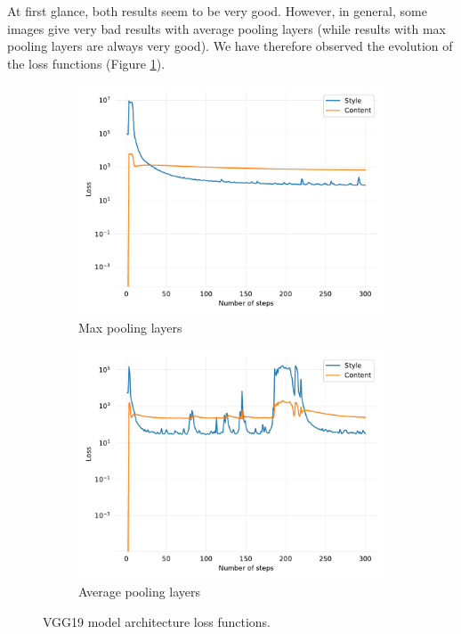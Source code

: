 \documentclass[twocolumn,superscriptaddress,aps,floatfix,nofootinbib]{revtex4-1}
\begin{document}
    At first glance, both results seem to be very good. However, in general, some images give very bad results with average pooling layers (while results with max pooling layers are always very good). We have therefore observed the evolution of the loss functions (Figure \ref{fig:model.architecture.loss}).
    
    \begin{figure}[ht]
        \centering
        \begin{subfigure}[b]{0.22\textwidth}
            \centering
            \includegraphics[width=\textwidth]{resources/pdf/architecture/sun-trees-paris-maxpool.pdf}
            \caption{Max pooling layers}
        \end{subfigure}
        \hfill
        \begin{subfigure}[b]{0.22\textwidth}
            \centering
            \includegraphics[width=\textwidth]{resources/pdf/architecture/sun-trees-paris-avgpool.pdf}
            \caption{Average pooling layers}
        \end{subfigure}
        \caption{VGG19 model architecture loss functions.}
        \label{fig:model.architecture.loss}
    \end{figure}
    
\end{document}
